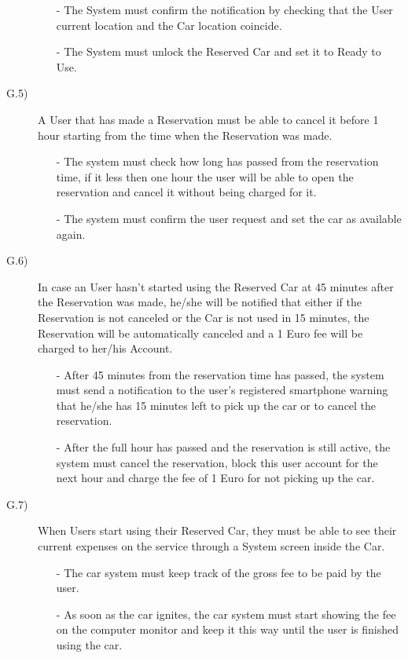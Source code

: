 \documentclass[a4paper]{article}
\begin{document}
\begin{description}
\begin{itemize}
	\item[-]The System must confirm the notification by checking that the User current location and the Car location coincide.
	\item[-]The System must unlock the Reserved Car and set it to Ready to Use.
\end{itemize}
\item [G.5)]A User that has made a Reservation must be able to cancel it before 1 hour starting from the time when the Reservation was made.
\begin{itemize}
	\item[-]The system must check how long has passed from the reservation time, if it less then one hour the user will be able to open the reservation and cancel it without being charged for it.
	\item[-]The system must confirm the user request and set the car as available again.
\end{itemize}
\item [G.6)]In case an User hasn't started using the Reserved Car at 45 minutes after the Reservation was made, he/she will be notified that either if the Reservation is not canceled or the Car is not used in 15 minutes, the Reservation will be automatically canceled and a 1 Euro fee will be charged to her/his Account.
\begin{itemize}
	\item[-]After 45 minutes from the reservation time has passed, the system must send a notification to the user's registered smartphone warning that he/she has 15 minutes left to pick up the car or to cancel the reservation.
	\item[-]After the full hour has passed and the reservation is still active, the system must cancel the reservation, block this user account for the next hour and charge the fee of 1 Euro for not picking up the car.
\end{itemize}
\item [G.7)]When Users start using their Reserved Car, they must be able to see their current expenses on the service through a System screen inside the Car.
\begin{itemize}
	\item[-]The car system must keep track of the gross fee to be paid by the user.
	\item[-]As soon as the car ignites, the car system must start showing the fee on the computer monitor and keep it this way until the user is finished using the car.
\end{itemize}

\end{description}
\end{document}
